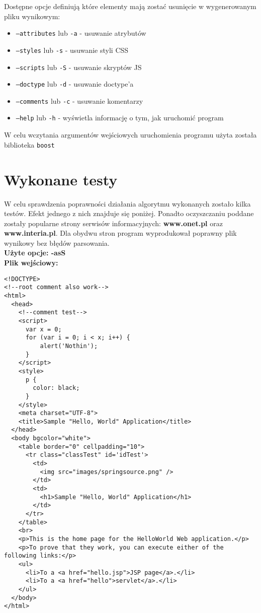 \documentclass[11pt]{article}
\def\code#1{\texttt{#1}}
\begin{document}
Dostępne opcje definiują które elementy mają zostać usunięcie w wygenerowanym pliku wynikowym:
\begin{itemize}
\item \code{--attributes} lub \code{-a} - usuwanie atrybutów
\item \code{--styles} lub \code{-s} - usuwanie styli CSS
\item \code{--scripts} lub \code{-S} - usuwanie skryptów JS
\item \code{--doctype} lub \code{-d} - usuwanie doctype'a
\item \code{--comments} lub \code{-c} - usuwanie komentarzy\\

\item \code{--help} lub \code{-h} - wyświetla informację o tym, jak uruchomić program
\end{itemize}

W celu wczytania argumentów wejściowych uruchomienia programu użyta została biblioteka \code{boost}

\section{Wykonane testy}
W celu sprawdzenia poprawności działania algorytmu wykonanych zostało kilka testów. Efekt jednego z nich znajduje się poniżej.
Ponadto oczyszczaniu poddane zostały popularne strony serwisów informacyjnych: \textbf{www.onet.pl} oraz \textbf{www.interia.pl}. Dla obydwu stron program wyprodukował poprawny plik wynikowy bez błędów parsowania.\\

\textbf{Użyte opcje: -asS}\\

\textbf{Plik wejściowy:}
\begin{Verbatim}[fontsize=\small]
<!DOCTYPE>
<!--root comment also work-->
<html>
  <head>
    <!--comment test-->
    <script>
      var x = 0;
      for (var i = 0; i < x; i++) {
          alert('Nothin');
      }
    </script>
    <style>
      p {
        color: black;
      }
    </style>
    <meta charset="UTF-8">
    <title>Sample "Hello, World" Application</title>
  </head>
  <body bgcolor="white">
    <table border="0" cellpadding="10">
      <tr class="classTest" id='idTest'>
        <td>
          <img src="images/springsource.png" />
        </td>
        <td>
          <h1>Sample "Hello, World" Application</h1>
        </td>
      </tr>
    </table>
    <br>
    <p>This is the home page for the HelloWorld Web application.</p>
    <p>To prove that they work, you can execute either of the following links:</p>
    <ul>
      <li>To a <a href="hello.jsp">JSP page</a>.</li>
      <li>To a <a href="hello">servlet</a>.</li>
    </ul>
  </body>
</html>
\end{Verbatim}
\end{document}
